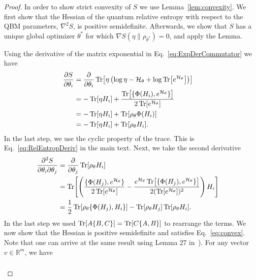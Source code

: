 \documentclass[
    reprint,
    aps,
    prx,
    longbibliography
]{revtex4-2}
\begin{document}
\begin{proof}
In order to show strict convexity of $S$ we use Lemma~\ref{lem:convexity}. We first show that the Hessian of the quantum relative entropy with respect to the QBM parameters, $\nabla^2 S$, is positive semidefinite. Afterwards, we show that $S$ has a unique global optimizer $\theta^*$ for which $\nabla S(\eta \|\rho_{\theta^*})=0$, and apply the Lemma. 

Using the derivative of the matrix exponential in Eq.~\eqref{eq:ExpDerCommutator} we have
\begin{align}
\begin{split}
\label{eq:deriv_alt}
    \frac{\partial S}{\partial \theta_{i}} &= \frac{\partial}{\partial \theta_{i}} \Tr[ \eta \left( \log{\eta}-\mathcal{H}_\theta+\log \Tr[e^{\mathcal{H}_\theta} ] \right ) ] \\
    &= -\Tr[\eta H_{i}] + \frac{ \Tr[ \{\Phi(H_i), e^{\mathcal{H}_\theta} \} ] } {2 \Tr[e^{\mathcal{H}_\theta}] }  \\
    &= -\Tr[\eta H_{i}] +\Tr[\rho_\theta \Phi(H_{i})] \\
    &= -\Tr[\eta H_{i}] +\Tr[\rho_\theta H_{i}].
\end{split}
\end{align}
In the last step, we use the cyclic property of the trace. This is Eq.~\eqref{eq:RelEntropDeriv} in the main text. Next, we take the second derivative
\begin{align}
\begin{split}
\label{eq:hessian_new}
    \frac{\partial^2 S}{\partial \theta_{i} \partial \theta_{j}} &=  \frac{\partial}{\partial \theta_{j} } \Tr[\rho_\theta H_{i}] \\
    &= \Tr[\left( \frac{ \{ \Phi(H_j), e^{\mathcal{H}_\theta} \} } {2 \Tr[e^{\mathcal{H}_\theta} ] }  - \frac{ e^{\mathcal{H}_\theta} \Tr[ \{ \Phi(H_j), e^{\mathcal{H}_\theta} \} ] } {2 (\Tr[e^{\mathcal{H}_\theta} ])^2} \right)  H_{i} ]\\
    &= \frac{1}{2} \Tr[ \rho_\theta \{ \Phi(H_j), H_i \}] - \Tr[ \rho_\theta H_j] \Tr[ \rho_\theta H_i] . 
\end{split}
\end{align}
In the last step we used $\Tr[ A \{B, C\}] = \Tr[ C \{A, B\}]$ to rearrange the terms. We now show that the Hessian is positive semidefinite and satisfies Eq.~\eqref{eq:convex}. Note that one can arrive at the same result using Lemma 27 in~\cite{Anshu_2021}). For any vector $v \in \mathbb{R}^m$, we have
\begin{align}
\begin{split}

\end{split}
\end{align}
\end{proof}
\end{document}
